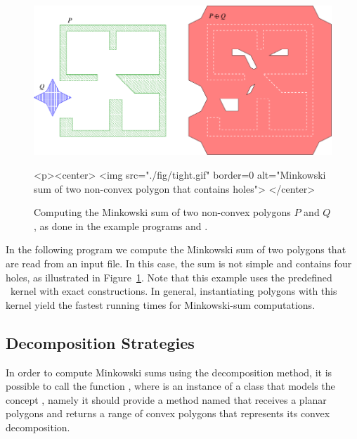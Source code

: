 
\begin{figure}[t]
\begin{ccTexOnly}
  \begin{center}
    \includegraphics{Minkowski_sum_2/fig/tight}
  \end{center}
\end{ccTexOnly}
\begin{ccHtmlOnly}
  <p><center>
  <img src="./fig/tight.gif" border=0 alt="Minkowski sum of two non-convex polygon that contains holes">
  </center>
\end{ccHtmlOnly}
\caption{Computing the Minkowski sum of two non-convex polygons $P$ and $Q$,
as done in the example programs  and
.}
\label{mink_fig:sum_holes}
\end{figure}

In the following program we compute the Minkowski sum of two polygons
that are read from an input file. In this case, the sum is not simple
and contains four holes, as illustrated in Figure~\ref{mink_fig:sum_holes}.
Note that this example uses the predefined \cgal\ kernel with exact
constructions. In general, instantiating polygons with this kernel yield
the fastest running times for Minkowski-sum computations.


\subsection{Decomposition Strategies}
\label{mink_ssec:decomp}

In order to compute Minkowski sums using the decomposition method, it is
possible to call the function , where
 is an instance of a class that models the concept
, namely it should provide a method named
 that receives a planar polygons and returns a range
of convex polygons that represents its convex decomposition.

